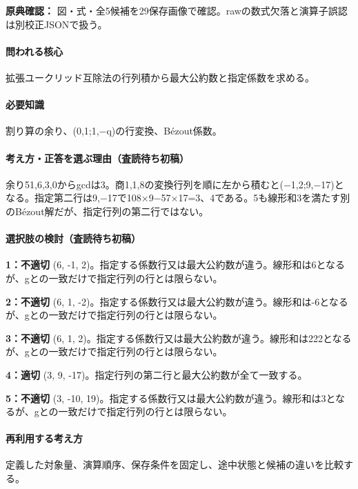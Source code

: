 \noindent\textbf{原典確認：} 図・式・全5候補を29保存画像で確認。rawの数式欠落と演算子誤認は別校正JSONで扱う。\par

\paragraph{問われる核心} 拡張ユークリッド互除法の行列積から最大公約数と指定係数を求める。

\paragraph{必要知識} 割り算の余り、(0,1;1,−q)の行変換、Bézout係数。

\paragraph{考え方・正答を選ぶ理由（査読待ち初稿）} 余り51,6,3,0からgcdは3。商1,1,8の変換行列を順に左から積むと(−1,2;9,−17)となる。指定第二行は9,−17で108×9−57×17=\allowbreak{}3、4である。5も線形和3を満たす別のBézout解だが、指定行列の第二行ではない。

\paragraph{選択肢の検討（査読待ち初稿）}\mbox{}\par

\noindent\textbf{1：不適切} (6, -1, 2)。指定する係数行又は最大公約数が違う。線形和は6となるが、gとの一致だけで指定行列の行とは限らない。\par

\noindent\textbf{2：不適切} (6, 1, -2)。指定する係数行又は最大公約数が違う。線形和は-6となるが、gとの一致だけで指定行列の行とは限らない。\par

\noindent\textbf{3：不適切} (6, 1, 2)。指定する係数行又は最大公約数が違う。線形和は222となるが、gとの一致だけで指定行列の行とは限らない。\par

\noindent\textbf{4：適切} (3, 9, -17)。指定行列の第二行と最大公約数が全て一致する。\par

\noindent\textbf{5：不適切} (3, -10, 19)。指定する係数行又は最大公約数が違う。線形和は3となるが、gとの一致だけで指定行列の行とは限らない。\par

\paragraph{再利用する考え方} 定義した対象量、演算順序、保存条件を固定し、途中状態と候補の違いを比較する。

